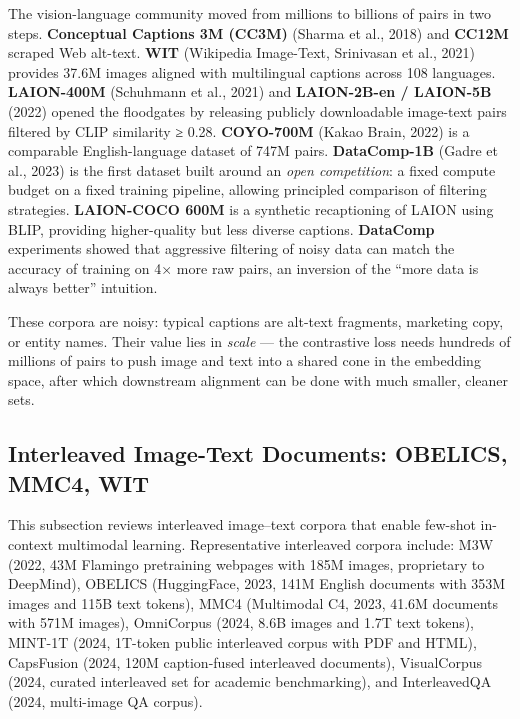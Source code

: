 The vision-language community moved from millions to billions of pairs in two steps. \textbf{Conceptual Captions 3M (CC3M)} (Sharma et al., 2018) and \textbf{CC12M} scraped Web alt-text. \textbf{WIT} (Wikipedia Image-Text, Srinivasan et al., 2021) provides 37.6M images aligned with multilingual captions across 108 languages. \textbf{LAION-400M} (Schuhmann et al., 2021) and \textbf{LAION-2B-en / LAION-5B} (2022) opened the floodgates by releasing publicly downloadable image-text pairs filtered by CLIP similarity ≥ 0.28. \textbf{COYO-700M} (Kakao Brain, 2022) is a comparable English-language dataset of 747M pairs. \textbf{DataComp-1B} (Gadre et al., 2023) is the first dataset built around an \emph{open competition}: a fixed compute budget on a fixed training pipeline, allowing principled comparison of filtering strategies. \textbf{LAION-COCO 600M} is a synthetic recaptioning of LAION using BLIP, providing higher-quality but less diverse captions. \textbf{DataComp} experiments showed that aggressive filtering of noisy data can match the accuracy of training on 4× more raw pairs, an inversion of the ``more data is always better'' intuition.

These corpora are noisy: typical captions are alt-text fragments, marketing copy, or entity names. Their value lies in \emph{scale} --- the contrastive loss needs hundreds of millions of pairs to push image and text into a shared cone in the embedding space, after which downstream alignment can be done with much smaller, cleaner sets.

\subsection{Interleaved Image-Text Documents: OBELICS, MMC4, WIT}\label{interleaved-image-text-documents-obelics-mmc4-wit}

This subsection reviews interleaved image--text corpora that enable few-shot in-context multimodal learning. Representative interleaved corpora include: M3W (2022, 43M Flamingo pretraining webpages with 185M images, proprietary to DeepMind), OBELICS (HuggingFace, 2023, 141M English documents with 353M images and 115B text tokens), MMC4 (Multimodal C4, 2023, 41.6M documents with 571M images), OmniCorpus (2024, 8.6B images and 1.7T text tokens), MINT-1T (2024, 1T-token public interleaved corpus with PDF and HTML), CapsFusion (2024, 120M caption-fused interleaved documents), VisualCorpus (2024, curated interleaved set for academic benchmarking), and InterleavedQA (2024, multi-image QA corpus).

